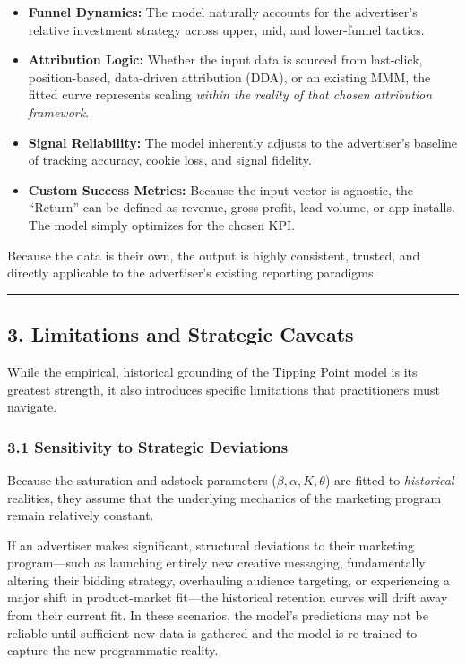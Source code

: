 \documentclass[
]{article}
\providecommand{\tightlist}{%
  \setlength{\itemsep}{0pt}\setlength{\parskip}{0pt}}
\begin{document}
\begin{itemize}
\tightlist
\item
  \textbf{Funnel Dynamics:} The model naturally accounts for the
  advertiser's relative investment strategy across upper, mid, and
  lower-funnel tactics.
\item
  \textbf{Attribution Logic:} Whether the input data is sourced from
  last-click, position-based, data-driven attribution (DDA), or an
  existing MMM, the fitted curve represents scaling \emph{within the
  reality of that chosen attribution framework}.
\item
  \textbf{Signal Reliability:} The model inherently adjusts to the
  advertiser's baseline of tracking accuracy, cookie loss, and signal
  fidelity.
\item
  \textbf{Custom Success Metrics:} Because the input vector is agnostic,
  the ``Return'' can be defined as revenue, gross profit, lead volume,
  or app installs. The model simply optimizes for the chosen KPI.
\end{itemize}

Because the data is their own, the output is highly consistent, trusted,
and directly applicable to the advertiser's existing reporting
paradigms.

\begin{center}\rule{0.5\linewidth}{0.5pt}\end{center}

\subsection{3. Limitations and Strategic
Caveats}\label{limitations-and-strategic-caveats}

While the empirical, historical grounding of the Tipping Point model is
its greatest strength, it also introduces specific limitations that
practitioners must navigate.

\subsubsection{3.1 Sensitivity to Strategic
Deviations}\label{sensitivity-to-strategic-deviations}

Because the saturation and adstock parameters
(\(\beta, \alpha, K, \theta\)) are fitted to \emph{historical}
realities, they assume that the underlying mechanics of the marketing
program remain relatively constant.

If an advertiser makes significant, structural deviations to their
marketing program---such as launching entirely new creative messaging,
fundamentally altering their bidding strategy, overhauling audience
targeting, or experiencing a major shift in product-market fit---the
historical retention curves will drift away from their current fit. In
these scenarios, the model's predictions may not be reliable until
sufficient new data is gathered and the model is re-trained to capture
the new programmatic reality.
\end{document}
